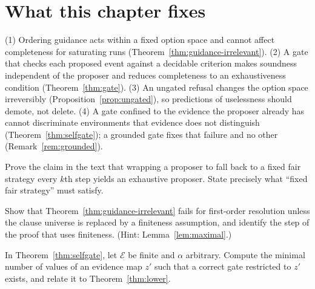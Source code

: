 \section{What this chapter fixes}

\begin{principal}
(1) Ordering guidance acts within a fixed option space and cannot affect completeness for saturating runs (Theorem~\ref{thm:guidance-irrelevant}). (2) A gate that checks each proposed event against a decidable criterion makes soundness independent of the proposer and reduces completeness to an exhaustiveness condition (Theorem~\ref{thm:gate}). (3) An ungated refusal changes the option space irreversibly (Proposition~\ref{prop:ungated}), so predictions of uselessness should demote, not delete. (4) A gate confined to the evidence the proposer already has cannot discriminate environments that evidence does not distinguish (Theorem~\ref{thm:selfgate}); a grounded gate fixes that failure and no other (Remark~\ref{rem:grounded}).
\end{principal}

\begin{exercise}
Prove the claim in the text that wrapping a proposer to fall back to a fixed fair strategy every $k$th step yields an exhaustive proposer. State precisely what ``fixed fair strategy'' must satisfy.
\end{exercise}

\begin{exercise}
Show that Theorem~\ref{thm:guidance-irrelevant} fails for first-order resolution unless the clause universe is replaced by a finiteness assumption, and identify the step of the proof that uses finiteness. (Hint: Lemma~\ref{lem:maximal}.)
\end{exercise}

\begin{exercise}
In Theorem~\ref{thm:selfgate}, let $\mathcal E$ be finite and $\alpha$ arbitrary. Compute the minimal number of values of an evidence map $z'$ such that a correct gate restricted to $z'$ exists, and relate it to Theorem~\ref{thm:lower}.
\end{exercise}
